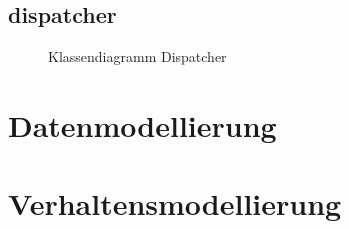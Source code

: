 \subsection{dispatcher}\label{subsec:dispatcher}

\begin{figure}
    \caption{Klassendiagramm Dispatcher}
    \label{fig:cd-dispatcher}
\end{figure}

\section{Datenmodellierung}\label{sec:datenmodellierung}



\FloatBarrier
\section{Verhaltensmodellierung}\label{sec:verhaltensmodellierung}

